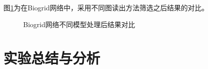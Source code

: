 图\ref{fig:result/Biogrid/readout}为在Biogrid网络中，采用不同图读出方法筛选之后结果的对比。
\begin{figure}[htbp]
    \centering
    \vskip0.2cm
    \caption{Biogrid网络不同模型处理后结果对比}
    \label{fig:result/Biogrid/readout}
\end{figure}




\section{实验总结与分析}
\label{section:resultSummary}